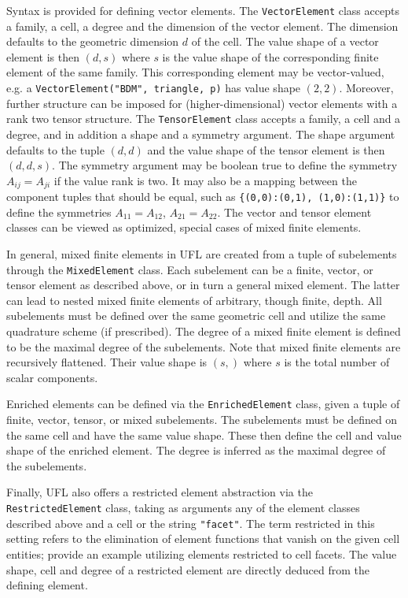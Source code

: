 \documentclass[prodmode,acmtoms]{acmsmall}
\newcommand{\uflc}[1]{\texttt{#1}}
\begin{document}
Syntax is provided for defining vector elements. The \uflc{VectorElement}
class accepts a family, a cell, a degree and the dimension of the
vector element. The dimension defaults to the geometric dimension $d$
of the cell. The value shape of a vector element is then $(d, s)$
where $s$ is the value shape of the corresponding finite element
of the same family. This corresponding element may be vector-valued,
e.g. a \uflc{VectorElement("BDM", triangle, p)} has value shape
$(2,2)$. Moreover, further structure can be imposed for
(higher-dimensional) vector elements with a rank two tensor structure. The
\uflc{TensorElement} class accepts a family, a cell and a degree, and in
addition a shape and a symmetry argument. The shape argument defaults
to the tuple $(d, d)$ and the value shape of the tensor element is
then~$(d, d, s)$. The symmetry argument may be boolean true to define
the symmetry $A_{ij} = A_{ji}$ if the value rank is two. It may also
be a mapping between the component tuples that should be equal, such
as \uflc{\{(0,0):(0,1),
  (1,0):(1,1)\}} to define the symmetries $A_{11}=A_{12}$,
$A_{21}=A_{22}$.  The vector and tensor element classes can be viewed
as optimized, special cases of mixed finite elements.

In general, mixed finite elements in UFL are created from a tuple of
subelements through the \uflc{MixedElement} class. Each subelement can
be a finite, vector, or tensor element as described above, or in turn
a general mixed element. The latter can lead to nested mixed finite
elements of arbitrary, though finite, depth. All subelements must be
defined over the same geometric cell and utilize the same quadrature
scheme (if prescribed). The degree of a mixed finite element is
defined to be the maximal degree of the subelements. Note that mixed
finite elements are recursively flattened. Their value shape is $(s,
)$ where $s$ is the total number of scalar components.

Enriched elements can be defined via the \uflc{EnrichedElement} class,
given a tuple of finite, vector, tensor, or mixed subelements. The
subelements must be defined on the same cell and have the same value
shape. These then define the cell and value shape of the enriched
element. The degree is inferred as the maximal degree of the
subelements.

Finally, UFL also offers a restricted element abstraction via the
\uflc{RestrictedElement} class, taking as arguments any of the element
classes described above and a cell or the string \uflc{"facet"}.
The term restricted in this
setting refers to the elimination of element functions that vanish on
the given cell entities; \citet{labeur:2012} provide an example utilizing
elements restricted to cell facets. The value shape, cell and degree
of a restricted element are directly deduced from the defining
element.
\end{document}
